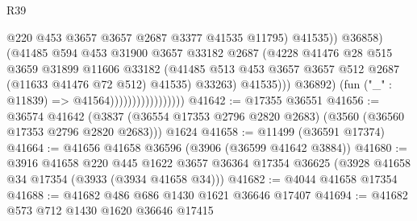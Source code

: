 \begin{lexlean}{R39}
\begin{coremodule}
                                                  @220
                                                  @453
                                                  @3657
                                                  @3657
                                                  @2687
                                                  @3377
                                                  @41535
                                                  @11795)
                                                @41535))
                                            @36858)
                                          (@41485
                                            @594
                                            @453
                                            @31900
                                            @3657
                                            @33182
                                            @2687
                                            (@4228
                                              @41476
                                              @28
                                              @515
                                              @3659
                                              @31899
                                              @11606
                                              @33182
                                              (@41485
                                                @513
                                                @453
                                                @3657
                                                @3657
                                                @512
                                                @2687
                                                (@11633 @41476 @72 @512)
                                                @41535)
                                              @33263)
                                            @41535)))
                                      @36892)
                                    (fun ("_" : @11839) => @41564)))))))))))))))))
@41642 := @17355 @36551
@41656 := @36574
    @41642
    (@3837 (@36554 @17353 @2796 @2820 @2683) (@3560 (@36560 @17353 @2796 @2820 @2683)))
    @1624
@41658 := @11499 (@36591 @17374)
@41664 := @41656 @41658 @36596 (@3906 (@36599 @41642 @3884))
@41680 := @3916
    @41658
    @220
    @445
    @1622
    @3657
    @36364
    @17354
    @36625
    (@3928 @41658 @34 @17354 (@3933 (@3934 @41658 @34)))
@41682 := @4044 @41658 @17354
@41688 := @41682 @486 @686 @1430 @1621 @36646 @17407
@41694 := @41682 @573 @712 @1430 @1620 @36646 @17415

\end{coremodule}
\end{lexlean}
